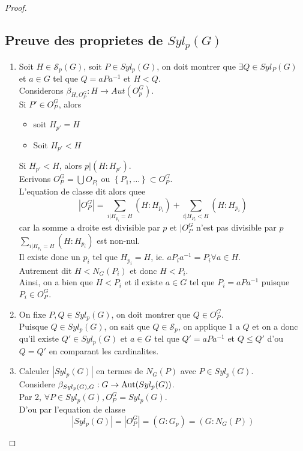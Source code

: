 \documentclass[../main.tex]{subfiles}
\begin{document}
\begin{proof}
\subsection{Preuve des proprietes de $Syl_p( G) $ }
\begin{enumerate}
\item Soit $H \in \mathcal{S}_p( G) $, soit $P\in Syl_p( G) $, on doit montrer que
$\exists Q \in Syl_P( G) $ et $a\in G$ tel que $Q= aPa^{-1}$ et $H < Q$.\\
Considerons $\beta_{H, O_P^{G}} : H \to Aut( O_p^{G}) $.\\
Si $P'\in O_P^{G}$, alors 
\begin{itemize}
\item soit $H_{p'} =H$ 
\item Soit $H_{p'} < H$
\end{itemize}
Si $H_{p'} < H$, alors $p | ( H:H_{p'} ) $.\\
Ecrivons $O_P^{G}= \bigcup O_{P_i} $ ou $\left\{ P_1, \ldots \right\} \subset O_P^{G}$.\\
L'equation de classe dit alors quee
\[ 
|O_P^{G}| = \sum_{i | H_{p_i} = H}^{ } ( H: H_{p_i} ) + \sum_{i | H_{P_i} < H}^{ }( H:H_{p_i} ) 
\]
car la somme a droite est divisible par $p$  et $|O_P^{G}$ n'est pas divisible par $p$ $ \sum_{i | H_{p_i} = H}^{ } ( H: H_{p_i} ) $ est non-nul.\\
Il existe donc un $p_i$ tel que $H_{p_i} = H$, ie. $aP_i a^{-1}= P_i \forall a \in H$.\\
Autrement dit $ H < N_G( P_i) $ et donc $H< P_i$.\\
Ainsi, on a bien que $H<P_i$ et il existe $a \in G$ tel que $P_i = aPa^{-1}$ puisque $P_i \in O_P^{G}$.\\
\item On fixe $P, Q\in Syl_p( G) $, on doit montrer que $Q \in O_P^{G}$.\\
	Puisque $Q \in Syl_p( G) $, on sait que $Q \in \mathcal{S}_p$, on applique $1$ a $Q$ et on a donc qu'il existe $Q' \in Syl_p( G) $ et $a \in G$ tel que $Q' = aPa^{-1}$ et $Q \leq  Q'$ d'ou $Q= Q'$ en comparant les cardinalites.
\item Calculer $ |Syl_p( G) | $ en termes de $N_G( P) $ avec $P \in Syl_p( G) $.\\
	Considere $\beta_{Syl_p( G) , G} : G \to\operatorname{Aut}( Syl_p( G) ) $.\\
	Par 2, $\forall P \in Syl_p( G) , O_P^{G}= Syl_p( G) $.\\
	D'ou par l'equation de classe
	\[ 
	|Syl_p( G) | = |O_P^{G}| = ( G:G_p) = ( G: N_G( P) ) 
	\]


\end{enumerate}
\end{proof}
\end{document}
